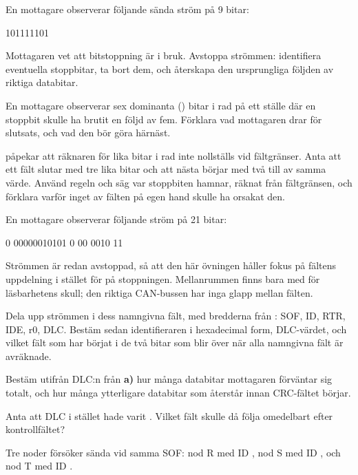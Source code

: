  En mottagare observerar följande sända ström på 9 bitar:

\begin{textdrawing}
101111101
\end{textdrawing}

Mottagaren vet att bitstoppning är i bruk. Avstoppa strömmen: identifiera eventuella stoppbitar, ta
bort dem, och återskapa den ursprungliga följden av riktiga databitar.

 En mottagare observerar sex dominanta () bitar i rad på ett ställe där en stoppbit
skulle ha brutit en följd av fem. Förklara vad mottagaren drar för slutsats, och vad den bör göra
härnäst.

  påpekar att räknaren för lika bitar i rad inte nollställs vid
fältgränser. Anta att ett fält slutar med tre lika bitar och att nästa börjar med två till av samma
värde. Använd regeln och säg var stoppbiten hamnar, räknat från fältgränsen, och förklara varför
inget av fälten på egen hand skulle ha orsakat den.

\label{c10:ex:decode}
En mottagare observerar följande ström på 21 bitar:

\begin{textdrawing}
0 00000010101 0 00 0010 11
\end{textdrawing}

Strömmen är redan avstoppad, så att den här övningen håller fokus på fältens uppdelning i stället
för på stoppningen. Mellanrummen finns bara med för läsbarhetens skull; den riktiga CAN-bussen har
inga glapp mellan fälten.

 Dela upp strömmen i dess namngivna fält, med bredderna från :
SOF, ID, RTR, IDE, r0, DLC. Bestäm sedan identifieraren i hexadecimal form, DLC-värdet, och vilket
fält som har börjat i de två bitar som blir över när alla namngivna fält är avräknade.

 Bestäm utifrån DLC:n från \textbf{a)} hur många databitar mottagaren förväntar sig totalt,
och hur många ytterligare databitar som återstår innan CRC-fältet börjar.

 Anta att DLC i stället hade varit . Vilket fält skulle då följa omedelbart efter
kontrollfältet?

\label{c10:ex:arb3}
Tre noder försöker sända vid samma SOF: nod R med ID , nod S med ID , och
nod T med ID .

